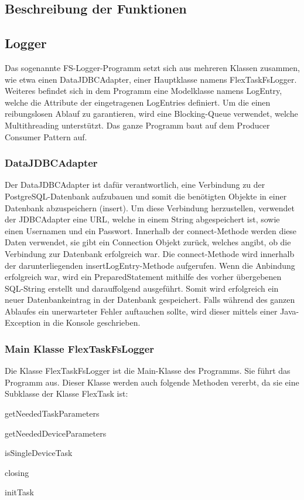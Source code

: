 \subsection{Beschreibung der Funktionen}


\subsection{Logger}
Das sogenannte FS-Logger-Programm setzt sich aus mehreren Klassen zusammen, wie etwa einen DataJDBCAdapter, einer Hauptklasse namens FlexTaskFsLogger. Weiteres befindet sich in dem Programm eine Modelklasse namens LogEntry, welche die Attribute der eingetragenen LogEntries definiert. Um die einen reibungslosen Ablauf zu garantieren, wird eine Blocking-Queue verwendet, welche Multithreading unterstützt. Das ganze Programm baut auf dem Producer Consumer Pattern auf.	

\subsubsection{DataJDBCAdapter}
Der DataJDBCAdapter ist dafür verantwortlich, eine Verbindung zu der PostgreSQL-Datenbank aufzubauen und somit die benötigten Objekte in einer Datenbank abzuspeichern (insert). Um diese Verbindung herzustellen, verwendet der JDBCAdapter eine URL, welche in einem String abgespeichert ist, sowie einen Usernamen und ein Passwort. Innerhalb der connect-Methode werden diese Daten verwendet, sie gibt ein Connection Objekt zurück, welches angibt, ob die Verbindung zur Datenbank erfolgreich war. Die connect-Methode wird innerhalb der darunterliegenden insertLogEntry-Methode aufgerufen. Wenn die Anbindung erfolgreich war, wird ein PreparedStatement mithilfe des vorher übergebenen SQL-String erstellt und darauffolgend ausgeführt. Somit wird erfolgreich ein neuer Datenbankeintrag in der Datenbank gespeichert. Falls während des ganzen Ablaufes ein unerwarteter Fehler auftauchen sollte, wird dieser mittels einer Java-Exception in die Konsole geschrieben.

\subsubsection{Main Klasse FlexTaskFsLogger}
Die Klasse FlexTaskFsLogger ist die Main-Klasse des Programms. Sie führt das Programm aus. Dieser Klasse werden auch folgende Methoden vererbt, da sie eine Subklasse der Klasse FlexTask ist: 
\begin{compactitem}
    \item getNeededTaskParameters
    \item getNeededDeviceParameters
    \item isSingleDeviceTask
    \item closing
    \item initTask
\end{compactitem}

